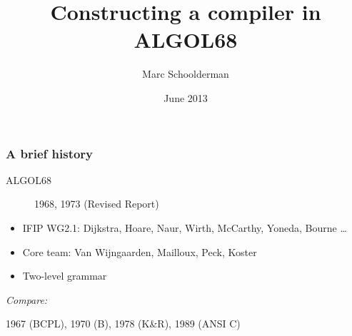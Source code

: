 \documentclass{beamer}
\title[algol68-spl\hspace{2em}\insertframenumber/\inserttotalframenumber]{Constructing a compiler in ALGOL68}
\subtitle{}
\author{Marc Schoolderman}
\date{June 2013}
\begin{document}
\begin{frame}
\titlepage
\setcounter{framenumber}{0}
\end{frame}

\newtheorem{code}[theorem]{}

\begin{frame}
  \begin{figure}[t]
    \centering
  \end{figure}
\end{frame}

\begin{frame}
\frametitle{A brief history}
\begin{description}
\item[ALGOL68] 1968, 1973 (Revised Report)
\end{description}
\begin{itemize}
\item IFIP WG2.1: Dijkstra, Hoare, Naur, Wirth, McCarthy, Yoneda, Bourne \ldots
\item Core team: Van Wijngaarden, Mailloux, Peck, Koster
\item Two-level grammar
\end{itemize}
\vspace{1cm}
\emph{Compare:}
\begin{description}[align=left]
\item[C] 1967 (BCPL), 1970 (B), 1978 (K\&R), 1989 (ANSI C)
\end{description}
\end{frame}
\end{document}
